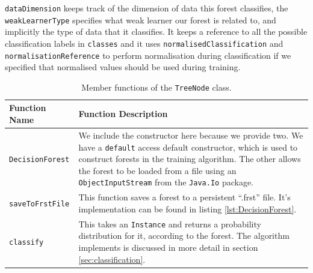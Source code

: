 \documentclass[12pt,twoside,notitlepage]{report}
\begin{document}
                \texttt{dataDimension} keeps track of the dimension of data this forest classifies, the 
                \texttt{weakLearnerType} specifies what weak learner our forest is related to, and implicitly the type 
                of data that it classifies. It keeps a reference to all the possible classification labels in 
                \texttt{classes} and it uses \texttt{normalisedClassification} and \texttt{normalisationReference} to 
                perform normalisation during classification if we specified that normalised values should be used during 
                training.

                \begin{table}[H]
                    \begin{tabularx}{\textwidth}{l|X}
                        \textbf{Function Name} & \textbf{Function Description} \\
                        \hline

                        \texttt{DecisionForest} & 
                            We include the constructor here because we provide two. We have a \texttt{default} access 
                            default constructor, which is used to construct forests in the training algorithm. The 
                            other allows the forest to be loaded from a file using an \texttt{ObjectInputStream} from 
                            the \texttt{Java.Io} package. \\ 
                        \hline

                        \texttt{saveToFrstFile} & 
                            This function saves a forest to a persistent ``.frst'' file. It's implementation can be
                            found in listing \ref{lst:DecisionForest}. \\ 
                        \hline

                        \texttt{classify} & 
                            This takes an \texttt{Instance} and returns a probability distribution for it, according 
                            to the forest. The algorithm implements is discussed in more detail in section 
                            \ref{sec:classification}. \\ 

                    \end{tabularx}
                    \caption{Member functions of the \texttt{TreeNode} class.}
                    \label{tab:DecisionForest}
                \end{table}
\end{document}
